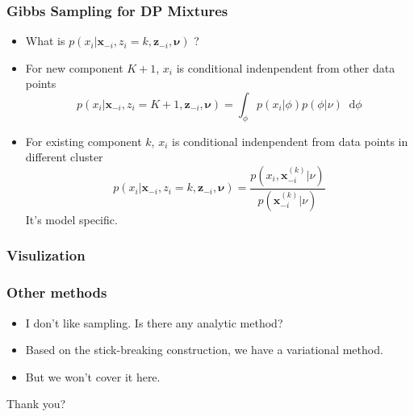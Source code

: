 \documentclass{beamer}
\newcommand*\diff{\mathop{}\!\mathrm{d}}
\begin{document}
\begin{frame}
	\frametitle{Gibbs Sampling for DP Mixtures}
	\begin{itemize}
		\item What is $p(x_i|\bm{x}_{-i}, z_i=k, \bm{z}_{-i}, \bm{\nu})$ ?
		\item For new component $K+1$, $x_i$ is conditional indenpendent from other data points
		\[
		p(x_i|\bm{x}_{-i}, z_i=K+1, \bm{z}_{-i}, \bm{\nu})
		= \int_{\phi} p(x_i|\phi)p(\phi | \nu) \diff \phi
		\]
		\item For existing component $k$, $x_i$ is conditional indenpendent from data points in different cluster
		\[
		p(x_i|\bm{x}_{-i}, z_i=k, \bm{z}_{-i}, \bm{\nu})
		= \frac{p(x_i, \bm{x}_{-i}^{(k)}|\nu)}{p(\bm{x}_{-i}^{(k)}|\nu)}
		\]		
		It's model specific.
	\end{itemize}
\end{frame}
\begin{frame}
	\frametitle{Visulization}
\end{frame}
\begin{frame}
	\frametitle{Other methods}
	\begin{itemize}
		\item I don't like sampling. Is there any analytic method?
		\item Based on the stick-breaking construction, we have a variational method.
		\item But we won't cover it here.
	\end{itemize}
\end{frame}

\begin{frame}[plain] 
	\begin{center} 
		\Huge Thank you? 
	\end{center} 
\end{frame} 
\end{document}
